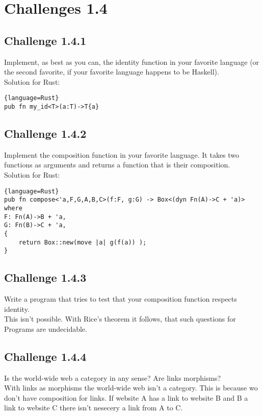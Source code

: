 \documentclass[11pt]{article}
\begin{document}
    \section*{Challenges 1.4}
    \subsection*{Challenge 1.4.1}
    Implement, as best as you can, the identity function in your favorite
    language (or the second favorite, if your favorite language
    happens to be Haskell).\\
    Solution for Rust:
    \begin{lstlisting}{language=Rust}
pub fn my_id<T>(a:T)->T{a}
    \end{lstlisting}

    \subsection*{Challenge 1.4.2}
    Implement the composition function in your favorite language. It
    takes two functions as arguments and returns a function that is
    their composition.\\
    Solution for Rust:
    \begin{lstlisting}{language=Rust}
pub fn compose<'a,F,G,A,B,C>(f:F, g:G) -> Box<(dyn Fn(A)->C + 'a)>
where
F: Fn(A)->B + 'a,
G: Fn(B)->C + 'a, 
{
    return Box::new(move |a| g(f(a)) );
}
    \end{lstlisting}

    \subsection*{Challenge 1.4.3}
    Write a program that tries to test that your composition function
    respects identity.\\
    This isn't possible. With Rice's theorem it follows, that such questions for Programs are undecidable.

    \subsection*{Challenge 1.4.4}
    Is the world-wide web a category in any sense? Are links morphisms?\\
    With links as morphisms the world-wide web isn't a category. This is because wo don't have composition for links. If website A has a link to website B and B a link to website C there isn't nesecery a link from A to C.\\
\end{document}
